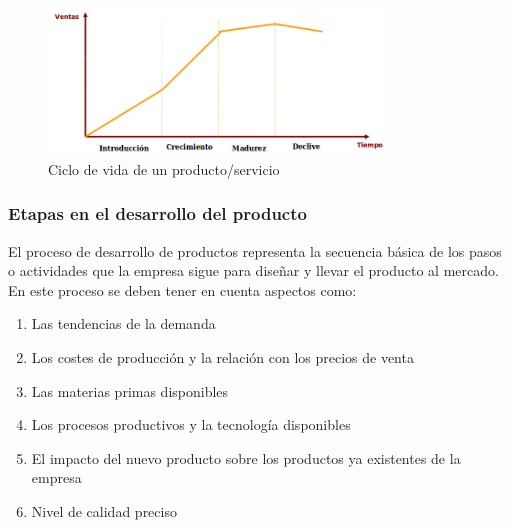 \documentclass[10pt,a4paper,spanish]{report}
\begin{document}
                        \begin{figure}
                              \centering
                              \includegraphics[width=0.8\textwidth]{2}
                              \caption{Ciclo de vida de un producto/servicio}
                              \label{vida_producto}
                        \end{figure}

                  \subsubsection{\textcolor[rgb]{0.9,0.7,0.6}Etapas en el desarrollo del producto}

                        El proceso de desarrollo de productos representa la secuencia básica de los pasos o actividades que la empresa sigue para diseñar y llevar el producto al mercado. En este proceso se deben tener en cuenta aspectos como:
                        \begin{enumerate}[1)]
                              \item Las tendencias de la demanda
                              \item Los costes de producción y la relación con los precios de venta
                              \item Las materias primas disponibles
                              \item Los procesos productivos y la tecnología disponibles
                              \item El impacto del nuevo producto sobre los productos ya existentes de la empresa
                              \item Nivel de calidad preciso
                        \end{enumerate}
                        
\end{document}
